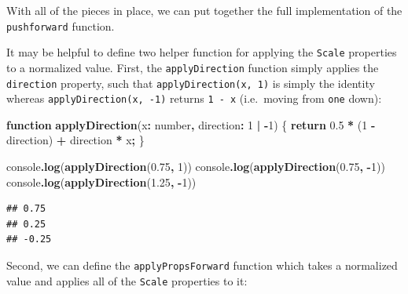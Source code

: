 \documentclass[
]{book}
\newenvironment{Shaded}{\begin{snugshade}}{\end{snugshade}}
\newcommand{\BuiltInTok}[1]{#1}
\newcommand{\ControlFlowTok}[1]{\textcolor[rgb]{0.13,0.29,0.53}{\textbf{#1}}}
\newcommand{\DataTypeTok}[1]{\textcolor[rgb]{0.13,0.29,0.53}{#1}}
\newcommand{\DecValTok}[1]{\textcolor[rgb]{0.00,0.00,0.81}{#1}}
\newcommand{\FloatTok}[1]{\textcolor[rgb]{0.00,0.00,0.81}{#1}}
\newcommand{\FunctionTok}[1]{\textcolor[rgb]{0.13,0.29,0.53}{\textbf{#1}}}
\newcommand{\KeywordTok}[1]{\textcolor[rgb]{0.13,0.29,0.53}{\textbf{#1}}}
\newcommand{\NormalTok}[1]{#1}
\newcommand{\OperatorTok}[1]{\textcolor[rgb]{0.81,0.36,0.00}{\textbf{#1}}}
\theoremstyle{definition}
\theoremstyle{definition}
\theoremstyle{definition}
\theoremstyle{definition}
\theoremstyle{remark}
\begin{document}
With all of the pieces in place, we can put together the full implementation of the \texttt{pushforward} function.

It may be helpful to define two helper function for applying the \texttt{Scale} properties to a normalized value. First, the \texttt{applyDirection} function simply applies the \texttt{direction} property, such that \texttt{applyDirection(x,\ 1)} is simply the identity whereas \texttt{applyDirection(x,\ -1)} returns \texttt{1\ -\ x} (i.e.~moving from \texttt{one} down):

\begin{Shaded}
\begin{Highlighting}[]
\KeywordTok{function} \FunctionTok{applyDirection}\NormalTok{(x}\OperatorTok{:} \DataTypeTok{number}\OperatorTok{,}\NormalTok{ direction}\OperatorTok{:} \DecValTok{1} \OperatorTok{|} \OperatorTok{{-}}\DecValTok{1}\NormalTok{) \{}
  \ControlFlowTok{return} \FloatTok{0.5} \OperatorTok{*}\NormalTok{ (}\DecValTok{1} \OperatorTok{{-}}\NormalTok{ direction) }\OperatorTok{+}\NormalTok{ direction }\OperatorTok{*}\NormalTok{ x}\OperatorTok{;}
\NormalTok{\}}

\BuiltInTok{console}\OperatorTok{.}\FunctionTok{log}\NormalTok{(}\FunctionTok{applyDirection}\NormalTok{(}\FloatTok{0.75}\OperatorTok{,} \DecValTok{1}\NormalTok{))}
\BuiltInTok{console}\OperatorTok{.}\FunctionTok{log}\NormalTok{(}\FunctionTok{applyDirection}\NormalTok{(}\FloatTok{0.75}\OperatorTok{,} \OperatorTok{{-}}\DecValTok{1}\NormalTok{))}
\BuiltInTok{console}\OperatorTok{.}\FunctionTok{log}\NormalTok{(}\FunctionTok{applyDirection}\NormalTok{(}\FloatTok{1.25}\OperatorTok{,} \OperatorTok{{-}}\DecValTok{1}\NormalTok{))}
\end{Highlighting}
\end{Shaded}

\begin{verbatim}
## 0.75
## 0.25
## -0.25
\end{verbatim}

Second, we can define the \texttt{applyPropsForward} function which takes a normalized value and applies all of the \texttt{Scale} properties to it:
\end{document}
